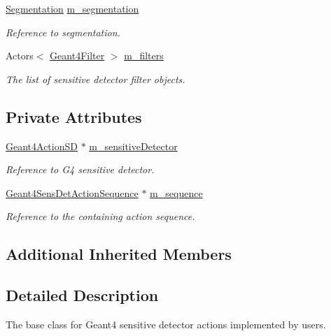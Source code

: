 \begin{DoxyCompactItemize}
\hyperlink{class_d_d4hep_1_1_simulation_1_1_geant4_sensitive_ac898770dc0c398f3b7b88d1bf5f72314}{Segmentation} \hyperlink{class_d_d4hep_1_1_simulation_1_1_geant4_sensitive_ab7817460de763632e629982ca4c2c847}{m\+\_\+segmentation}
\begin{DoxyCompactList}\small\item\em Reference to segmentation. \end{DoxyCompactList}\item 
Actors$<$ \hyperlink{class_d_d4hep_1_1_simulation_1_1_geant4_filter}{Geant4\+Filter} $>$ \hyperlink{class_d_d4hep_1_1_simulation_1_1_geant4_sensitive_a7486440af0fb52c3ab233544262d2c95}{m\+\_\+filters}
\begin{DoxyCompactList}\small\item\em The list of sensitive detector filter objects. \end{DoxyCompactList}\end{DoxyCompactItemize}
\subsection*{Private Attributes}
\begin{DoxyCompactItemize}
\item 
\hyperlink{class_d_d4hep_1_1_simulation_1_1_geant4_action_s_d}{Geant4\+Action\+SD} $\ast$ \hyperlink{class_d_d4hep_1_1_simulation_1_1_geant4_sensitive_afc56b9a8666f9fe594516436f7fdd4e0}{m\+\_\+sensitive\+Detector}
\begin{DoxyCompactList}\small\item\em Reference to G4 sensitive detector. \end{DoxyCompactList}\item 
\hyperlink{class_d_d4hep_1_1_simulation_1_1_geant4_sens_det_action_sequence}{Geant4\+Sens\+Det\+Action\+Sequence} $\ast$ \hyperlink{class_d_d4hep_1_1_simulation_1_1_geant4_sensitive_a7c98977dbb602b8053f21ff8e36f925d}{m\+\_\+sequence}
\begin{DoxyCompactList}\small\item\em Reference to the containing action sequence. \end{DoxyCompactList}\end{DoxyCompactItemize}
\subsection*{Additional Inherited Members}


\subsection{Detailed Description}
The base class for Geant4 sensitive detector actions implemented by users. 

